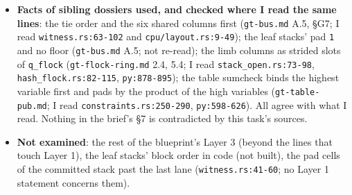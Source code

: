 \begin{itemize}
\item \textbf{Facts of sibling dossiers used, and checked where I read the same lines}: the tie order and the six shared columns first (\texttt{gt-{}bus.\allowbreak{}md} A.5, §G7; I read \texttt{witness.\allowbreak{}rs:63-{}102} and \texttt{cpu/\allowbreak{}layout.\allowbreak{}rs:9-{}49}); the leaf stacks' pad \texttt{1} and no floor (\texttt{gt-{}bus.\allowbreak{}md} A.5; not re-read); the limb columns as strided slots of \texttt{q\_\allowbreak{}flock} (\texttt{gt-{}flock-{}ring.\allowbreak{}md} 2.4, 5.4; I read \texttt{stack\_\allowbreak{}open.\allowbreak{}rs:73-{}98}, \texttt{hash\_\allowbreak{}flock.\allowbreak{}rs:82-{}115}, \texttt{py:878-{}895}); the table sumcheck binds the highest variable first and pads by the product of the high variables (\texttt{gt-{}table-{}pub.\allowbreak{}md}; I read \texttt{constraints.\allowbreak{}rs:250-{}290}, \texttt{py:598-{}626}). All agree with what I read. Nothing in the brief's §7 is contradicted by this task's sources.
\item \textbf{Not examined}: the rest of the blueprint's Layer 3 (beyond the lines that touch Layer 1), the leaf stacks' block order in code (not built), the pad cells of the committed stack past the last lane (\texttt{witness.\allowbreak{}rs:41-{}60}; no Layer 1 statement concerns them).
\end{itemize}

